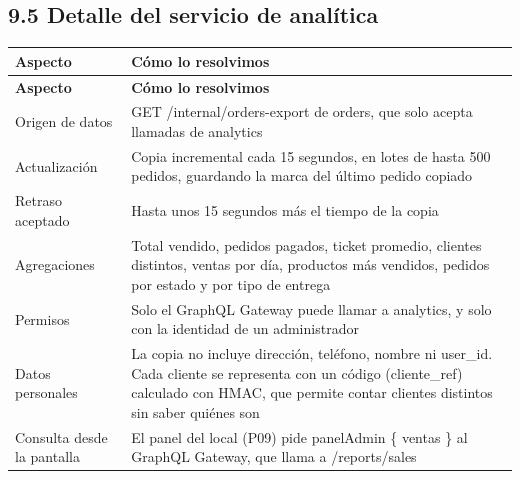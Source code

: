 \documentclass[10pt,letterpaper]{article}
\begin{document}
\subsection*{9.5 Detalle del servicio de analítica}
{\footnotesize
\begin{longtable}{|P{\tabcolsep\relax}|P{\tabcolsep\relax}|}
\hline
\textbf{Aspecto} & \textbf{Cómo lo resolvimos} \\ \hline
\endfirsthead
\hline
\textbf{Aspecto} & \textbf{Cómo lo resolvimos} \\ \hline
\endhead
Origen de datos & GET /\allowbreak{}internal/\allowbreak{}orders-export de orders, que solo acepta llamadas de analytics \\ \hline
Actualización & Copia incremental cada 15 segundos, en lotes de hasta 500 pedidos, guardando la marca del último pedido copiado \\ \hline
Retraso aceptado & Hasta unos 15 segundos más el tiempo de la copia \\ \hline
Agregaciones & Total vendido, pedidos pagados, ticket promedio, clientes distintos, ventas por día, productos más vendidos, pedidos por estado y por tipo de entrega \\ \hline
Permisos & Solo el GraphQL Gateway puede llamar a analytics, y solo con la identidad de un administrador \\ \hline
Datos personales & La copia no incluye dirección, teléfono, nombre ni user\_\allowbreak{}id. Cada cliente se representa con un código (cliente\_\allowbreak{}ref) calculado con HMAC, que permite contar clientes distintos sin saber quiénes son \\ \hline
Consulta desde la pantalla & El panel del local (P09) pide panelAdmin \{ ventas \} al GraphQL Gateway, que llama a /\allowbreak{}reports/\allowbreak{}sales \\ \hline
\end{longtable}}
\end{document}
